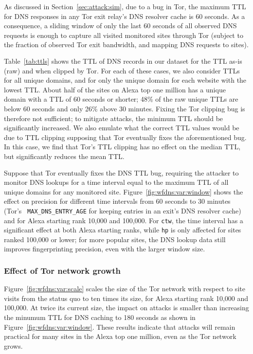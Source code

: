 As discussed in Section~\ref{sec:attack:sim}, due to a bug in Tor, the
maximum TTL for DNS responses in any Tor exit relay's DNS resolver cache
is 60 seconds. As a consequence, a sliding window of only the last 60
seconds of all observed DNS requests is enough to capture all visited
monitored sites through Tor (subject to the fraction of observed Tor
exit bandwidth, and mapping DNS requests to sites).

Table~\ref{tab:ttls} shows the TTL of DNS records in our dataset for the
TTL as-is (raw) and when clipped by Tor.  For each of these cases, we
also consider TTLs for all unique domains, and for only the unique
domain for each website with the lowest TTL.  About half of the sites on
Alexa top one million has a unique domain with a TTL of 60 seconds or
shorter; 48\% of the raw unique TTLs are below 60 seconds and only 26\%
above 30 minutes. Fixing the Tor clipping bug is therefore not
sufficient; to mitigate \name attacks, the minimum TTL should be
significantly increased.  We also emulate what the correct TTL values
would be due to TTL clipping supposing that Tor eventually fixes the
aforementioned bug.  In this case, we find that Tor's TTL clipping has
no effect on the median TTL, but significantly reduces the mean TTL.

Suppose that Tor eventually fixes the DNS TTL bug, requiring the
attacker to monitor DNS lookups for a time interval equal to the maximum
TTL of all unique domains for any monitored site.
Figure~\ref{fig:wfdns:var:window} shows the effect on precision for
different time intervals from 60 seconds to 30 minutes (Tor's {\tt
  MAX\_DNS\_ENTRY\_AGE} for keeping entries in an exit's DNS resolver
cache) and for Alexa starting rank 10,000 and 100,000. For \texttt{ctw},
the time interval has a significant effect at both Alexa starting ranks,
while \texttt{hp} is only affected for sites ranked 100,000 or lower;
for more popular sites, the DNS lookup data still improves
fingerprinting precision, even with the larger window size.

\subsubsection{Effect of Tor network growth}
Figure~\ref{fig:wfdns:var:scale} scales the size of the Tor network with
respect to site
visits from the status quo to ten times its size, for Alexa starting rank 10,000 and
100,000. At twice its current size, the impact on \name attacks is smaller than
increasing the minumum TTL for DNS caching to 180 seconds as shown in
Figure~\ref{fig:wfdns:var:window}. These results indicate that \name
attacks will remain
practical for many sites in the Alexa top one million, even as the Tor network grows.

